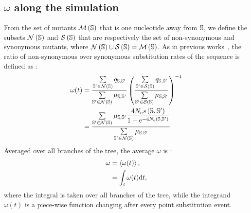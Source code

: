 \subsection{\texorpdfstring{$\omega$}{ω} along the simulation}
From the set of mutants $\mathcal{M}\left(\mathbb{S}\right)$ that is one nucleotide away from $\mathbb{S}$, we define the subsets $\mathcal{N}\left(\mathbb{S}\right)$ and $\mathcal{S}\left(\mathbb{S}\right)$ that are respectively the set of non-synonymous and synonymous mutants, where $\mathcal{N}\left(\mathbb{S}\right) \cup \mathcal{S}\left(\mathbb{S}\right) = \mathcal{M}\left(\mathbb{S}\right)$.
As in previous works~\citep{Spielman2015, DosReis2015, Jones2016}, the ratio of non-synonymous over synonymous substitution rates of the sequence is defined as :
\begin{align}
    \omega(t) &= \dfrac{\sum\limits_{\mathbb{S}' \in \mathcal{N}\left(\mathbb{S}\right)} q_{\mathbb{S}, \mathbb{S}'}}{\sum\limits_{\mathbb{S}' \in \mathcal{N}\left(\mathbb{S}\right)} \mu_{\mathbb{S}, \mathbb{S}'}} \left( \dfrac{\sum\limits_{\mathbb{S}' \in \mathcal{S}\left(\mathbb{S}\right)} q_{\mathbb{S}, \mathbb{S}'}}{\sum\limits_{\mathbb{S}' \in \mathcal{S}\left(\mathbb{S}\right)} \mu_{\mathbb{S}, \mathbb{S}'}} \right)^{-1}\\
    &= \dfrac{\sum\limits_{\mathbb{S}' \in \mathcal{N}\left(\mathbb{S}\right)} \mu_{\mathbb{S}, \mathbb{S}'} \dfrac{4 N_{\text{e}} s \left( \mathbb{S},\mathbb{S}'\right)}{{1 - \text{e}^{-4 N_{\text{e}} \left( \mathbb{S},\mathbb{S}'\right)} }}}{\sum\limits_{\mathbb{S}' \in \mathcal{N}\left(\mathbb{S}\right)} \mu_{\mathbb{S}, \mathbb{S}'}}
\end{align}
Averaged over all branches of the tree, the average $\omega$ is :
\begin{align}
    \omega & = \left\langle \omega(t) \right\rangle, \\
    & = \int_{t} \omega (t) \text{d} t,
\end{align}
where the integral is taken over all branches of the tree, while the integrand $\omega (t)$ is a piece-wise function changing after every point substitution event.
